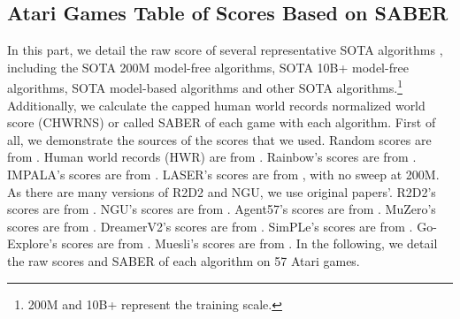 \documentclass[nohyperref]{article}
\theoremstyle{plain}
\begin{document}
\subsection{Atari Games Table of Scores Based on SABER}
\label{app: Atari Games Table of Scores Based on SABER}
In this part, we detail the raw score of several representative SOTA algorithms , including the SOTA 200M model-free algorithms, SOTA 10B+ model-free algorithms, SOTA model-based algorithms and other SOTA algorithms.\footnote{200M and 10B+ represent the training scale.} Additionally, we calculate the capped human world records normalized world score (CHWRNS) or called SABER \citep{atarihuman} of each game with each algorithm. First of all, we demonstrate the sources of the scores that we used.
Random scores  are from \citep{agent57}.
Human world records (HWR) are from \citep{dreamerv2,atarihuman}.
Rainbow's scores are from \citep{rainbow}.
IMPALA's scores are from \citep{impala}.
LASER's scores are from \citep{laser}, with no sweep at 200M.
As there are many versions of R2D2 and NGU, we use original papers'.
R2D2's scores are from \citep{r2d2}.
NGU's scores are from \citep{ngu}.
Agent57's scores are from \citep{agent57}.
MuZero's scores are from \citep{muzero}.
DreamerV2's scores are from \citep{dreamerv2}.
SimPLe's scores are from \citep{modelbasedatari}.
Go-Explore's scores are from \citep{goexplore}.
Muesli's scores are from \citep{muesli}.
In the following,  we detail the raw scores and SABER of each algorithm on 57 Atari games.
\clearpage
\end{document}
